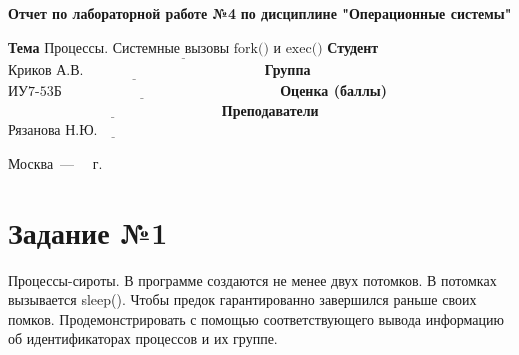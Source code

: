 \documentclass[12pt]{report}
\begin{document}
\begin{titlepage}
	
	\begin{center}
		\noindent\begin{minipage}{1.3\textwidth}\centering
			\Large\textbf{  Отчет по лабораторной работе №4}\newline
			\textbf{по дисциплине "Операционные системы"}\newline\newline
		\end{minipage}
	\end{center}
	
	\noindent\textbf{Тема} $\underline{\text{Процессы. Системные вызовы fork() и exec()}}$\newline\newline
	\noindent\textbf{Студент} $\underline{\text{Криков А.В.~~~~~~~~~~~~~~~~~~~~~~~~~~~~~~~~~~~~~~}}$\newline\newline
	\noindent\textbf{Группа} $\underline{\text{ИУ7-53Б~~~~~~~~~~~~~~~~~~~~~~~~~~~~~~~~~~~~~~~~~~~~~~}}$\newline\newline
	\noindent\textbf{Оценка (баллы)} $\underline{\text{~~~~~~~~~~~~~~~~~~~~~~~~~~~~~~~~~~~~~~~~~~~~~}}$\newline\newline
	\noindent\textbf{Преподаватели} $\underline{\text{Рязанова Н.Ю.~~~~~~~~~~~~~~~~~~~~~~~~~~}}$\newline\newline\newline
	
	\begin{center}
		\vfill
		Москва~---~\the\year
		~г.
	\end{center}
\end{titlepage}

\newpage

\section*{Задание №1}

Процессы-сироты. В программе создаются не менее двух потомков. В потомках вызывается sleep(). Чтобы предок гарантированно завершился раньше своих помков. Продемонстрировать с помощью соответствующего вывода информацию об идентификаторах процессов и их группе.
\end{document}
